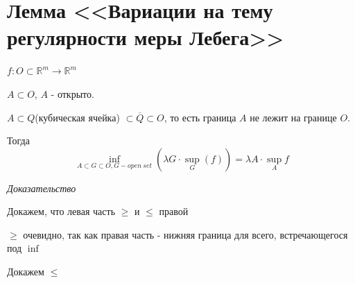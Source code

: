 \documentclass[paper=a4, fontsize=17pt]{article}
\begin{document}
\section{Лемма <<Вариации на тему регулярности меры Лебега>>}
$f: O \subset \mathds{R}^m \rightarrow \mathds{R}^m$

$A \subset O$, $A$ - открыто.

$A \subset Q$(кубическая ячейка) $\subset \overline Q \subset O$, то есть граница $A$ не лежит на границе $O$.

Тогда $$\inf_{A \subset G \subset O, G - open ~ set} (\lambda G \cdot \sup_G(f)) = \lambda A \cdot \sup_A f$$

\emph{Доказательство}

Докажем, что левая часть $\geqslant$ и $\leqslant$ правой

$\geqslant$ очевидно, так как правая часть - нижняя граница для всего, встречающегося под $\inf$

Докажем $\leqslant$
\end{document}
